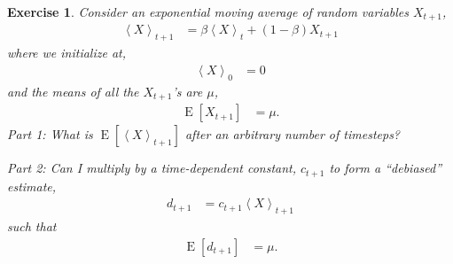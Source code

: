 \documentclass{article}
\newtheorem{exercise}{Exercise}
\newcommand{\bracket}[3]{\left#1 #3 \right#2}
\newcommand{\sqb}{\bracket{[}{]}}
\newcommand{\ab}{\bracket{\langle}{\rangle}}
\newcommand{\0}{\mathbf{0}}
\newcommand{\E}{\operatorname{E}\sqb}
\begin{document}
\begin{exercise}
  Consider an exponential moving average of random variables $X_{t+1}$,
  \begin{align}
    \label{eq:ex:abX}
    \ab{X}_{t+1} &= \beta \ab{X}_{t} + (1- \beta) X_{t+1}
  \end{align}
  where we initialize at,
  \begin{align}
    \ab{X}_{0} &= 0
  \end{align}
  and the means of all the $X_{t+1}$'s are $\mu$,
  \begin{align}
    \label{eq:ex:EX}
    \E{X_{t+1}} &= \mu.
  \end{align}
  Part 1: What is $\E{\ab{X}_{t+1}}$ after an arbitrary number of timesteps?  

  Part 2: Can I multiply by a time-dependent constant, $c_{t+1}$ to form a ``debiased'' estimate,
  \begin{align}
    d_{t+1} &= c_{t+1} \ab{X}_{t+1} 
  \end{align}
  such that
  \begin{align}
    \E{d_{t+1}} &= \mu.
  \end{align}
\end{exercise}
\end{document}
